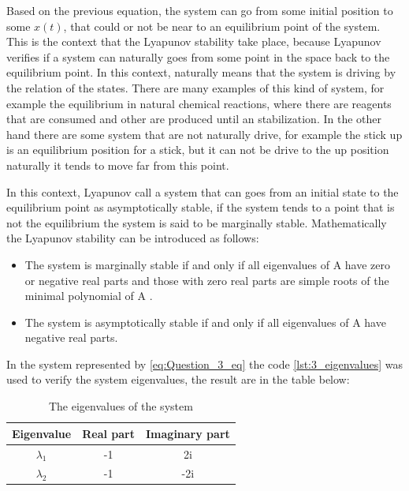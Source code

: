 \documentclass[a4paper]{article}
\begin{document}
Based on the previous equation, the system can go from some initial position to some $x(t)$, that could or not be near to an equilibrium point of the system. This is the context that the Lyapunov stability take place, because Lyapunov verifies if a system can naturally goes from some point in the space back to the equilibrium point. In this context, naturally means that the system is driving by the relation of the states. There are many examples of this kind of system, for example the equilibrium in natural chemical reactions, where there are reagents that are consumed and other are produced until an stabilization. In the other hand there are some system that are not naturally drive, for example the stick up is an equilibrium position for a stick, but it can not be drive to the up position naturally it tends to move far from this point.

In this context, Lyapunov call a system that can goes from an initial state to the equilibrium point as asymptotically stable, if the system tends to a point that is not the equilibrium the system is said to be marginally stable. Mathematically the Lyapunov stability can be introduced as follows: 


\begin{itemize}

\item The system is marginally stable if and only if all eigenvalues of A have zero or negative
real parts and those with zero real parts are simple roots of the minimal polynomial of A .

\item The system is asymptotically stable if and only if all eigenvalues of A have negative real parts.

\end{itemize}

In the system represented by \eqref{eq:Question_3_eq} the code \ref{lst:3_eigenvalues} was used to verify the system eigenvalues, the result are in the table below:

\begin{table}[H]
\centering
\begin{tabular}{|c|c|c|}
\hline
Eigenvalue & Real part & Imaginary part\\
\hline
$\lambda_1$&-1& 2i\\ 
\hline
$\lambda_2$& -1& -2i\\
\hline
\end{tabular}
\caption{The eigenvalues of the system}
\end{table}
\end{document}
